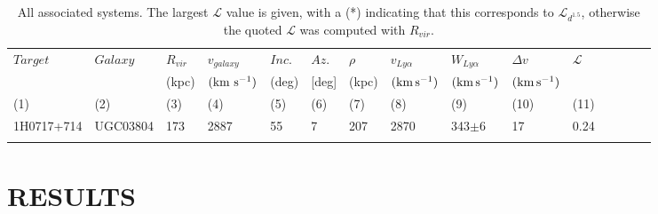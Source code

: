 \documentclass[iop]{emulateapj-rtx4}
\begin{document}
\begin{table}[ht]\footnotesize
\begin{center}
\begin{tabular}{l l l l l l l l l l l l l l l}
 \hline \hline
  $Target$	&  $Galaxy$  & $R_{vir}$        & $v_{galaxy}$ 	   	  &  $Inc.$               &  $Az.$ 	       & $\rho$		   & $v_{Ly\alpha}$	 	  	& $W_{Ly\alpha}$  & $\Delta v$  			 & $\mathcal{L}$ \\ 
  	  	&       & \scriptsize (kpc) & \scriptsize  $\rm (km ~s^{-1})$ & \scriptsize (deg) & \scriptsize [deg] & \scriptsize (kpc) & \scriptsize  $\rm (km\, s^{-1})$ & \scriptsize $\rm (km\, s^{-1})$ & \scriptsize  $\rm (km\, s^{-1})$ &  \\
 \scriptsize (1) & \scriptsize (2) & \scriptsize (3)    & \scriptsize (4)     & \scriptsize (5)    & \scriptsize (6)   & \scriptsize  (7)   & \scriptsize (8) & \scriptsize (9) & \scriptsize (10) & \scriptsize (11) \\ \hline \hline

1H0717+714  &  UGC03804  &  173  &  2887  &  55  &  7  &  207  &  2870  &  343$\pm$6  &  17  &  0.24  \\


 \\
\hline
\end{tabular}
\end{center}
  \caption{\small{All associated systems. The largest $\mathcal{L}$ value is given, with a (\**) indicating that this corresponds to $\mathcal{L}_{d^{1.5}}$, otherwise the quoted $\mathcal{L}$ was computed with $R_{vir}$.}}
  \label{target_table}
\end{table}


\section{RESULTS}


\end{document}
